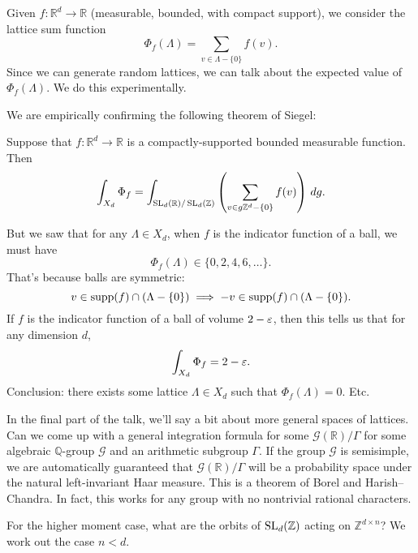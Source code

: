 \documentclass[reqno]{amsart} 
\begin{document}
Given $f : \mathbb{R}^d \rightarrow \mathbb{R}$ (measurable, bounded, with compact support), we consider the lattice sum function
\begin{equation*}
  \Phi_f (\Lambda ) = \sum_{v \in \Lambda - \{0\}}
f (v).  
\end{equation*}
Since we can generate random lattices, we can talk about the expected value of $\Phi_f (\Lambda )$.  We do this experimentally.

We are empirically confirming the following theorem of Siegel:
\begin{theorem}[Siegel, 1945]
  Suppose that $f : \mathbb{R}^d \rightarrow \mathbb{R} $ is a compactly-supported bounded measurable function.  Then
  \begin{equation*}
    \int_{X_d } \Phi_f  = \int_{\operatorname{SL}_d(\mathbb{R}) / \operatorname{SL}_d(\mathbb{Z})}
    \left( \sum_{v \in g \mathbb{Z}^d - \{0\}} f (v) \right)
    \, d g.
\end{equation*}
\end{theorem}
But we saw that for any $\Lambda \in X_d$, when $f$ is the indicator function of a ball, we must have
\begin{equation*}
  \Phi_f (\Lambda ) \in \{0, 2, 4, 6, \dotsc \}.
\end{equation*}
That's because balls are symmetric:
\begin{equation*}
  v \in \operatorname{supp}(f) \cap (\Lambda - \{0\})
  \implies - v \in \operatorname{supp} (f) \cap (\Lambda - \{0\}).
\end{equation*}
If $f$ is the indicator function of a ball of volume $2 - \varepsilon$, then this tells us that for any dimension $d$,
\begin{equation*}
\int_{X_d } \Phi_f = 2 - \varepsilon.
\end{equation*}
Conclusion: there exists some lattice $\Lambda \in X_d $ such that $\Phi_f (\Lambda)  = 0$.  Etc.

In the final part of the talk, we'll say a bit about more general spaces of lattices.  Can we come up with a general integration formula for some $\mathcal{G} (\mathbb{R} ) / \Gamma $ for some algebraic $\mathbb{Q}$-group $\mathcal{G}$ and an arithmetic subgroup $\Gamma$.  If the group $\mathcal{G}$ is semisimple, we are automatically guaranteed that $\mathcal{G} (\mathbb{R} ) / \Gamma $ will be a probability space under the natural left-invariant Haar measure.  This is a theorem of Borel and Harish--Chandra.  In fact, this works for any group with no nontrivial rational characters.

For the higher moment case, what are the orbits of $\operatorname{SL}_d(\mathbb{Z})$ acting on $\mathbb{Z}^{d \times n}$?  We work out the case $n < d$.
\end{document}
